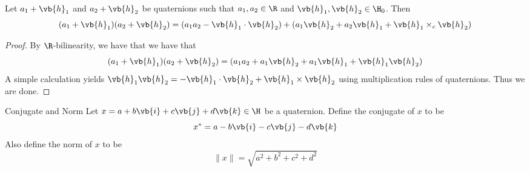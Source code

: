 \documentclass[a4paper]{article}
\begin{document}
\begin{prp}{}{} Let $a_1+\vb{h}_1$ and $a_2+\vb{h}_2$ be quaternions such that $a_1,a_2\in\R$ and $\vb{h}_1,\vb{h}_2\in\H_0$. Then $$(a_1+\vb{h}_1)(a_2+\vb{h}_2)=(a_1a_2-\vb{h}_1\cdot\vb{h}_2)+(a_1\vb{h}_2+a_2\vb{h}_1+\vb{h}_1\times_c\vb{h}_2)$$ 
\begin{proof}
By $\R$-bilinearity, we have that we have that $$(a_1+\vb{h}_1)(a_2+\vb{h}_2)=(a_1a_2+a_1\vb{h}_2+a_1\vb{h}_1+\vb{h}_1\vb{h}_2)$$ A simple calculation yields $\vb{h}_1\vb{h}_2=-\vb{h}_1\cdot\vb{h}_2+\vb{h}_1\times\vb{h}_2$ using multiplication rules of quaternions. Thus we are done. 
\end{proof}
\end{prp}

\begin{defn}{Conjugate and Norm}{} Let $x=a+b\vb{i}+c\vb{j}+d\vb{k}\in\H$ be a quaternion. Define the conjugate of $x$ to be $$x^\ast=a-b\vb{i}-c\vb{j}-d\vb{k}$$ Also define the norm of $x$ to be $$\|x\|=\sqrt{a^2+b^2+c^2+d^2}$$
\end{defn}
\end{document}

